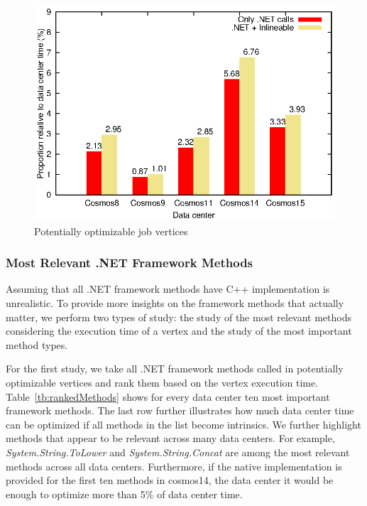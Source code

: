 \begin{figure}[ht]
\includegraphics[scale=0.8]{graphs/potentiallyOptimizable}

\caption{Potentially optimizable job vertices}
\label{fig:potentially}
\end{figure}

\subsubsection{Most Relevant .NET Framework Methods}
Assuming that all .NET framework methods have C++ implementation is unrealistic. 
To provide more insights on the framework methods that actually matter, we perform two types of study:
the study of the most relevant methods considering the execution time of a vertex and the study of the most important method types. 

For the first study, we take all .NET framework methods called in potentially optimizable vertices and rank them based on the vertex execution time. 
Table~\ref{tb:rankedMethods} shows for every data center ten most important framework methods. 
The last row further illustrates how much data center time can be optimized if all methods in the list become intrinsics.
We further highlight methods that appear to be relevant across many data centers.
For example, \emph{System.String.ToLower} and \emph{System.String.Concat} are among the most relevant methods across all data centers.
Furthermore, if the native implementation is provided for the first ten methods in cosmos14, the data center it would be enough to optimize more than 5\% of data center time.

